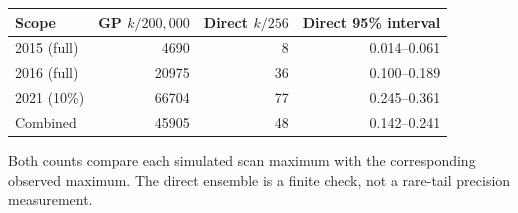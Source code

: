 \begin{center}\small\begin{tabular}{lrrr}\toprule
Scope & GP $k/200{,}000$ & Direct $k/256$ & Direct 95\% interval\\\midrule
2015 (full) & 4690 & 8 & 0.014--0.061\\
2016 (full) & 20975 & 36 & 0.100--0.189\\
2021 (10\%) & 66704 & 77 & 0.245--0.361\\
Combined & 45905 & 48 & 0.142--0.241\\
\bottomrule\end{tabular}\end{center}
Both counts compare each simulated scan maximum with the corresponding observed maximum. The direct ensemble is a finite check, not a rare-tail precision measurement.
